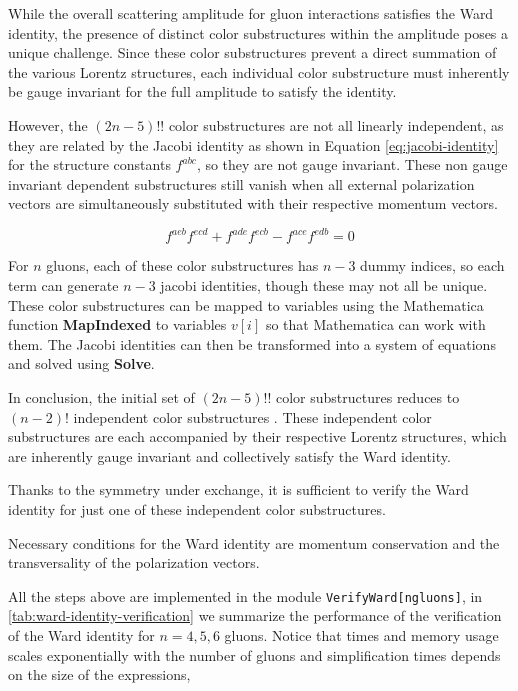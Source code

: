 \documentclass[main.tex]{subfiles}
\begin{document}
While the overall scattering amplitude for gluon interactions satisfies the Ward identity, the presence of distinct color substructures 
within the amplitude poses a unique challenge. Since these color substructures prevent a direct summation of the various 
Lorentz structures, each individual color substructure must inherently be gauge invariant for the full amplitude to satisfy the identity.

However, the $(2n-5)!!$ color substructures are not all linearly independent, as they are related by the Jacobi identity as shown in Equation \cref{eq:jacobi-identity} for the structure constants $f^{abc}$, so 
they are not gauge invariant. These non gauge invariant dependent substructures still vanish when all external polarization vectors are simultaneously substituted with their respective momentum vectors.

\begin{equation} \label{eq:jacobi-identity}
    f^{aeb}f^{ecd} + f^{ade}f^{ecb} - f^{ace}f^{edb} = 0
\end{equation}

For $n$ gluons, each of these color substructures has $n-3$ dummy indices, so each term can generate $n-3$ jacobi identities, though these may not all be unique.
These color substructures can be mapped to variables using the Mathematica function \textbf{MapIndexed} to variables $v[i]$ so that Mathematica can work with them.
The Jacobi identities can then be transformed into a system of equations and solved using \textbf{Solve}.

In conclusion, the initial set of $(2n-5)!!$ color substructures reduces to $(n-2)!$ independent color substructures \cite{DELDUCA200051}.
These independent color substructures are each accompanied by their respective Lorentz structures, which are inherently gauge invariant and collectively satisfy the Ward identity.

Thanks to the symmetry under exchange, it is sufficient to verify the Ward identity for just one of these independent color substructures.

Necessary conditions for the Ward identity are momentum conservation and the transversality of the polarization vectors.

All the steps above are implemented in the module \texttt{VerifyWard[ngluons]}, in \cref{tab:ward-identity-verification} we summarize the performance of the verification of the Ward identity for $n=4,5,6$ gluons.
Notice that times and memory usage scales exponentially with the number of gluons and simplification times depends on the size of the expressions,
\end{document}
